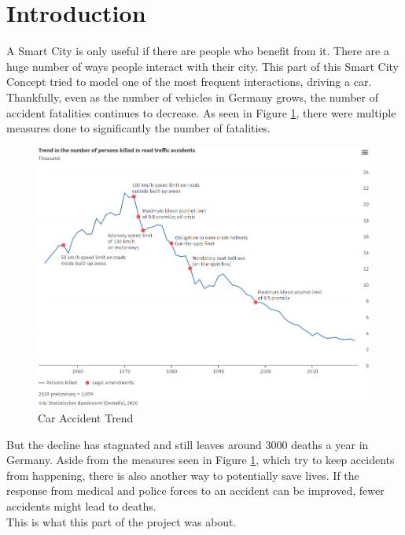 \section{Introduction}\label{6sec:1}


A Smart City is only useful if there are people who benefit from it.
There are a huge number of ways people interact with their city.
This part of this Smart City Concept tried to model 
one of the most frequent interactions, driving a car.
Thankfully, even as the number of vehicles in Germany grows\cite{carStat},
the number of accident fatalities continues to decrease.\cite{destatisCar}
As seen in Figure \ref{6fig:trend}, 
there were multiple measures done to significantly the number of fatalities. 

\begin{figure}[H]
  \includegraphics[width=0.9\linewidth]{chapters/chapter6_bruno/Figures/trendV2.png}
  \caption{Car Accident Trend \cite{destatisCar}}
  \label{6fig:trend}
\end{figure}

\noindent
But the decline has stagnated and still leaves around 3000 deaths a year in Germany.
Aside from the measures seen in Figure \ref{6fig:trend}, 
which try to keep accidents from happening, 
there is also another way to potentially save lives.
If the response from medical and police forces to an accident can be improved,
fewer accidents might lead to deaths. 
\\
\newline
This is what this part of the project was about.

